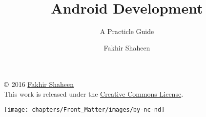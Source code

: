 
\title{Android Development}
\subtitle{A Practicle Guide}
\author{Fakhir Shaheen}







\titlepage


\begin{copyrightpage}
	$\copyright$ 2016 \href{fakhirshaheen.com}{Fakhir Shaheen}\\
	This work is released under the \href{https://en.wikipedia.org/wiki/Creative_Commons_license}{Creative Commons License}.
	
	\texttt{[image: chapters/Front\_Matter/images/by-nc-nd]}

\end{copyrightpage}

\dedication{To my family, with gratitude,\\ ---Fakhir}


